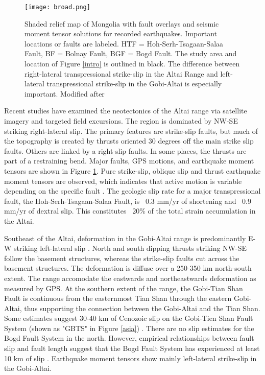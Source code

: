 \begin{figure}[h!]
	\centering
	\texttt{[image: broad.png]}
	\caption{Shaded relief map of Mongolia with fault overlays and seismic moment tensor solutions for recorded earthquakes. Important locations or faults are labeled. HTF = Hoh-Serh-Tsagaan-Salaa Fault, BF = Bolnay Fault, BGF = Bogd Fault. The study area and location of Figure \ref{intro} is outlined in black. The difference between right-lateral transpressional strike-slip in the Altai Range and left-lateral transpressional strike-slip in the Gobi-Altai is especially important. Modified after \citet{Calais2003}}
	\label{broad}
\end{figure}

	Recent studies have examined the neotectonics of the Altai range via satellite imagery and targeted field excursions\citep{Cunningham2005a}. The region is dominated by NW-SE striking right-lateral slip. The primary features are strike-slip faults, but much of the topography is created by thrusts oriented 30 degrees off the main strike slip faults. Others are linked by a right-slip faults. In some places, the thrusts are part of a restraining bend. Major faults, GPS motions, and earthquake moment tensors are shown in Figure \ref{broad}. Pure strike-slip, oblique slip and thrust earthquake moment tensors are observed, which indicates that active motion is variable depending on the specific fault \citep{Bayasgalan2005a}. The geologic slip rate for a major transpressional fault, the Hoh-Serh-Tsagaan-Salaa Fault, is ~0.3 mm/yr of shortening and ~0.9 mm/yr of dextral slip. This constitutes ~20\% of the total strain accumulation in the Altai. \citep{Frankel2010}

	Southeast of the Altai, deformation in the Gobi-Altai range is predominantly E-W striking left-lateral slip \citep{Cunningham2010}. North and south dipping thrusts striking NW-SE follow the basement structures, whereas the strike-slip faults cut across the basement structures. The deformation is diffuse over a 250-350 km north-south extent. The range accomodate the eastwards and northeastwards deformation as measured by GPS. At the southern extent of the range, the Gobi-Tian Shan Fault is continuous from the easternmost Tian Shan through the eastern Gobi-Altai, thus supporting the connection between the Gobi-Altai and the Tian Shan. Some estimates suggest 30-40 km of Cenozoic slip on the Gobi-Tien Shan Fault System (shown as "GBTS" in Figure \ref{asia}) \citep{Cunningham2003a}. There are no slip estimates for the Bogd Fault System in the north. However, empirical relationships between fault slip and fault length suggest that the Bogd Fault System has experienced at least 10 km of slip \citep{Cowie1992}.  Earthquake moment tensors show mainly left-lateral strike-slip in the Gobi-Altai. 

